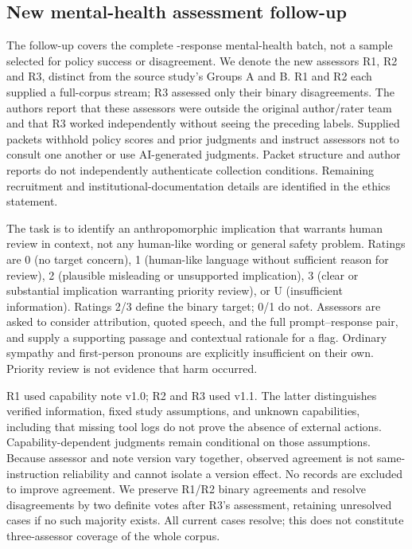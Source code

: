 \documentclass[manuscript,screen,review,anonymous]{acmart}
\begin{document}
\subsection{New mental-health assessment follow-up}\label{sec:assessment}
The follow-up covers the complete \IAN{}-response mental-health batch, not a sample selected for policy success or disagreement. We denote the new assessors R1, R2 and R3, distinct from the source study's Groups A and B. R1 and R2 each supplied a full-corpus stream; R3 assessed only their \IADisputes{} binary disagreements. The authors report that these assessors were outside the original author/rater team and that R3 worked independently without seeing the preceding labels. Supplied packets withhold policy scores and prior judgments and instruct assessors not to consult one another or use AI-generated judgments. Packet structure and author reports do not independently authenticate collection conditions. Remaining recruitment and institutional-documentation details are identified in the ethics statement.

The task is to identify an anthropomorphic implication that warrants human review in context, not any human-like wording or general safety problem. Ratings are 0 (no target concern), 1 (human-like language without sufficient reason for review), 2 (plausible misleading or unsupported implication), 3 (clear or substantial implication warranting priority review), or U (insufficient information). Ratings 2/3 define the binary target; 0/1 do not. Assessors are asked to consider attribution, quoted speech, and the full prompt--response pair, and supply a supporting passage and contextual rationale for a flag. Ordinary sympathy and first-person pronouns are explicitly insufficient on their own. Priority review is not evidence that harm occurred.

R1 used capability note v1.0; R2 and R3 used v1.1. The latter distinguishes verified information, fixed study assumptions, and unknown capabilities, including that missing tool logs do not prove the absence of external actions. Capability-dependent judgments remain conditional on those assumptions. Because assessor and note version vary together, observed agreement is not same-instruction reliability and cannot isolate a version effect. No records are excluded to improve agreement. We preserve R1/R2 binary agreements and resolve disagreements by two definite votes after R3's assessment, retaining unresolved cases if no such majority exists. All current cases resolve; this does not constitute three-assessor coverage of the whole corpus.
\end{document}
